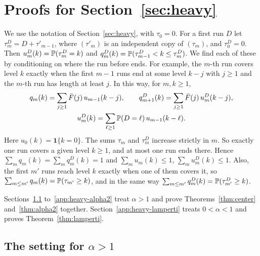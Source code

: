 \section{Proofs for Section~\ref{sec:heavy}}\label{app:heavy}

We use the notation of Section~\ref{sec:heavy}, with $\tau_0=0$. For a first run $D$ let
$\tau^D_m=D+\tau'_{m-1}$, where $(\tau'_m)$ is an independent copy of $(\tau_m)$, and
$\tau^D_0=0$. Then $u^D_m(k)=\mathbb{P}(\tau^D_m=k)$ and
$q^D_m(k)=\mathbb{P}(\tau^D_{m-1}<k\le\tau^D_m)$. We find each of these by conditioning on
where the run before ends. For example, the $m$-th run covers level $k$ exactly when the
first $m-1$ runs end at some level $k-j$ with $j\ge1$ and the $m$-th run has length at
least $j$. In this way, for $m,k\ge1$,
\begin{equation}\label{eq:C-conv}
\begin{gathered}
q_m(k)=\sum_{j\ge1}\bar F(j)\,u_{m-1}(k-j),\qquad
q^D_{m+1}(k)=\sum_{j\ge1}\bar F(j)\,u^D_m(k-j),\\
u^D_m(k)=\sum_{\ell\ge1}\mathbb{P}(D=\ell)\,u_{m-1}(k-\ell).
\end{gathered}
\end{equation}
Here $u_0(k)=\mathbf 1\{k=0\}$. The sums $\tau_m$ and $\tau^D_m$ increase strictly in $m$.
So exactly one run covers a given level $k\ge1$, and at most one run ends there. Hence
$\sum_mq_m(k)=\sum_mq^D_m(k)=1$ and $\sum_mu_m(k)\le1$, $\sum_mu^D_m(k)\le1$. Also, the
first $m'$ runs reach level $k$ exactly when one of them covers it, so
$\sum_{m\le m'}q_m(k)=\mathbb{P}(\tau_{m'}\ge k)$, and in the same way
$\sum_{m\le m'}q^D_m(k)=\mathbb{P}(\tau^D_{m'}\ge k)$.

Sections~\ref{app:heavy-setting} to~\ref{app:heavy-alpha2} treat $\alpha>1$ and prove
Theorems~\ref{thm:center} and~\ref{thm:alpha2} together.
Section~\ref{app:heavy-lamperti} treats $0<\alpha<1$ and proves
Theorem~\ref{thm:lamperti}.

\subsection{The setting for \texorpdfstring{$\alpha>1$}{alpha > 1}}\label{app:heavy-setting}

